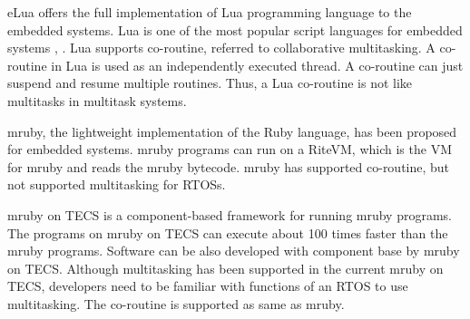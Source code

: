 \documentclass[a4j,12pt,oneside,openany,english]{jsbook}
\begin{document}
eLua offers the full implementation of Lua programming language to the embedded systems.
Lua is one of the most popular script languages for embedded systems \cite{url:Lua}, \cite{par:Lua}.
Lua supports co-routine, referred to collaborative multitasking.
A co-routine in Lua is used as an independently executed thread.
A co-routine can just suspend and resume multiple routines.
Thus, a Lua co-routine is not like multitasks in multitask systems.

mruby, the lightweight implementation of the Ruby language, has been proposed for embedded systems.
mruby programs can run on a RiteVM, which is the VM for mruby and reads the mruby bytecode.
mruby has supported co-routine, but not supported multitasking for RTOSs.

mruby on TECS is a component-based framework for running mruby programs.
The programs on mruby on TECS can execute about 100 times faster than the mruby programs.
Software can be also developed with component base by mruby on TECS.
Although multitasking has been supported in the current mruby on TECS, developers need to be familiar with functions of an RTOS to use multitasking.
The co-routine is supported as same as mruby.
\end{document}

